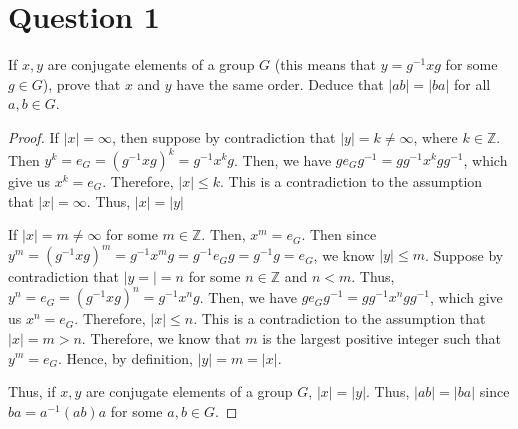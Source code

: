 \section{Question 1}

\begin{question}
    If $x,y$ are conjugate elements of a group $G$ (this means that $y = g^{−1}xg$ for some $g \in G$), prove that $x$ and $y$ have the same order. Deduce that $\lvert ab\rvert = \lvert ba\rvert$ for all $a,b ∈ G$.
\end{question}

\begin{answer}
    \begin{proof}
        If $\lvert x \rvert = \infty$, then suppose by contradiction that $\lvert y \rvert = k \neq \infty$, where $k \in \mathbb{Z}$. Then $y^k = e_G = (g^{-1}xg)^k = g^{-1}x^kg$. Then, we have $ge_Gg^{-1}=gg^{-1}x^kgg^{-1}$, which give us $x^k = e_G$. Therefore, $\lvert x \rvert \leq k$. This is a contradiction to the assumption that $\lvert x \rvert = \infty$. Thus, $\lvert x \rvert = \lvert y \rvert$
        
        If $\lvert x \rvert = m \neq \infty$ for some $m \in \mathbb{Z}$. Then, $x^m = e_G$. Then since $y^m = (g^{-1}xg)^m = g^{-1}x^mg = g^{-1}e_Gg = g^{-1}g = e_G$, we know $\lvert y \rvert \leq m$. Suppose by contradiction that $\lvert y = \rvert = n$ for some $n \in \mathbb{Z}$ and $n < m$. Thus, $y^n = e_G = (g^{-1}xg)^n = g^{-1}x^ng$. Then, we have $ge_Gg^{-1}=gg^{-1}x^ngg^{-1}$, which give us $x^n = e_G$. Therefore, $\lvert x \rvert \leq n$. This is a contradiction to the assumption that $\lvert x \rvert = m > n$. Therefore, we know that $m$ is the largest positive integer such that $y^m = e_G$. Hence, by definition, $\lvert y \rvert = m = \lvert x \rvert$.
        
        Thus, if $x,y$ are conjugate elements of a group $G$, $\lvert x \lvert = \lvert y \rvert$. Thus, $\lvert ab \rvert = \lvert ba \rvert$ since $ba = a^{-1}(ab)a$ for some $a,b \in G$.
    \end{proof}
\end{answer}